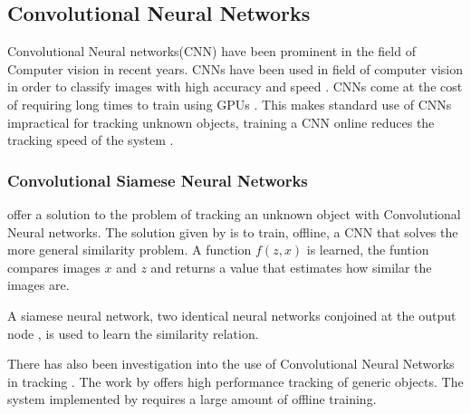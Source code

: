 \subsection{Convolutional Neural Networks}
  Convolutional Neural networks(CNN) have been prominent in the field of Computer vision in recent years.
  CNNs have been used in field of computer vision in order to classify images with high accuracy and speed \cite{razavian2014}.
  CNNs come at the cost of requiring long times to train using GPUs \cite{krizhevsky2012}.
  This makes standard use of CNNs impractical for tracking unknown objects, training a CNN online reduces the tracking speed of the system \cite{bertinetto2016}.

  \subsubsection{Convolutional Siamese Neural Networks}
  \citeauthor{bertinetto2016} \cite{bertinetto2016} offer a solution to the problem of tracking an unknown object with Convolutional Neural networks.
  The solution given by \citeauthor{bertinetto2016} is to train, offline, a CNN that solves the more general similarity problem.
  A function $f(z,x)$ is learned, the funtion compares images $x$ and $z$ and returns a value that estimates how similar the images are.

  A siamese neural network, two identical neural networks conjoined at the output node \cite{bromley1993}, is used to learn the similarity relation.

  There has also been investigation into the use of Convolutional Neural Networks in tracking \cite{CNNTracking}.
  The work by \citeauthor{CNNTracking} offers high performance tracking of generic objects.
  The system implemented by \citeauthor{CNNTracking} requires a large amount of offline training.
